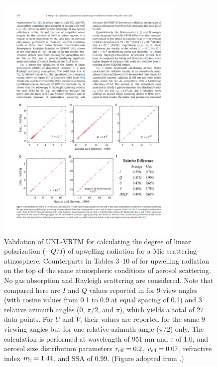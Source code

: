 \begin{figure}[t]
  \centering
  \includegraphics[width={0.8\textwidth}]{figures/unlvrtm3.pdf}
  \caption[Validation of UNL-VRTM for calculating the degree of linear
polarization for a Mie scattering
atmosphere.]
  {Validation of UNL-VRTM for calculating the degree of linear
polarization ($-Q/I$) of upwelling radiation for a Mie scattering
atmosphere. Counterparts in Tables 3--10 of \citet{Garcia89} for
upwelling radiation on the top of the same atmospheric conditions of
aerosol scattering. No gas absorption and Rayleigh scattering are
considered. Note that compared here are $I$ and $Q$ values reported 
in \citet{Garcia89} for 9 view angles (with cosine values from 0.1 
to 0.9 at equal spacing of 0.1) and 3 relative azimuth angles 
(0, $\pi/2$, and $\pi$), which yields a total of 27 data points. 
For $U$ and $V$, their values are reported for the same 9 viewing angles 
but for one relative azimuth angle ($\pi/2$) only. 
The calculation is performed at wavelength of 951 nm and $\tau$ of 1.0, 
and aerosol size distribution parameters $r_\text{eff}=0.2$, 
$v_\text{eff}=0.07$, refractive index $m_\text{r}=1.44$, and SSA of 0.99.
(Figure adopted from \citet{Wang14}.)}
  \label{fig:unlvrtm3}
\end{figure}

